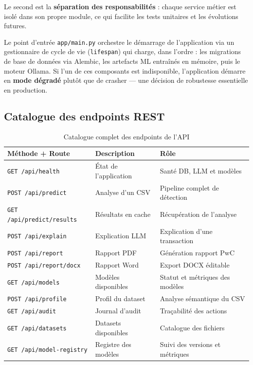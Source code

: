 \documentclass[12pt,a4paper,twoside]{report}
\begin{document}
Le second est la \textbf{séparation des responsabilités} : chaque service métier est isolé dans son propre module, ce qui facilite les tests unitaires et les évolutions futures.

Le point d'entrée \texttt{app/main.py} orchestre le démarrage de l'application via un gestionnaire de cycle de vie (\texttt{lifespan}) qui charge, dans l'ordre : les migrations de base de données via Alembic, les artefacts ML entraînés en mémoire, puis le moteur Ollama. Si l'un de ces composants est indisponible, l'application démarre en \textbf{mode dégradé} plutôt que de crasher --- une décision de robustesse essentielle en production.

\subsection{Catalogue des endpoints REST}

\begin{table}[H]
\centering
\caption{Catalogue complet des endpoints de l'API}
\label{tab:api_endpoints}
\begin{tabular}{lll}
\toprule
\textbf{Méthode + Route} & \textbf{Description} & \textbf{Rôle} \\
\midrule
\texttt{GET  /api/health}             & État de l'application    & Santé DB, LLM et modèles \\
\texttt{POST /api/predict}            & Analyse d'un CSV         & Pipeline complet de détection \\
\texttt{GET  /api/predict/results}    & Résultats en cache       & Récupération de l'analyse \\
\texttt{POST /api/explain}            & Explication LLM          & Explication d'une transaction \\
\texttt{POST /api/report}             & Rapport PDF              & Génération rapport PwC \\
\texttt{POST /api/report/docx}        & Rapport Word             & Export DOCX éditable \\
\texttt{GET  /api/models}             & Modèles disponibles      & Statut et métriques des modèles \\
\texttt{POST /api/profile}            & Profil du dataset        & Analyse sémantique du CSV \\
\texttt{GET  /api/audit}              & Journal d'audit          & Traçabilité des actions \\
\texttt{GET  /api/datasets}           & Datasets disponibles     & Catalogue des fichiers \\
\texttt{GET  /api/model-registry}     & Registre des modèles     & Suivi des versions et métriques \\
\bottomrule
\end{tabular}
\end{table}
\end{document}
